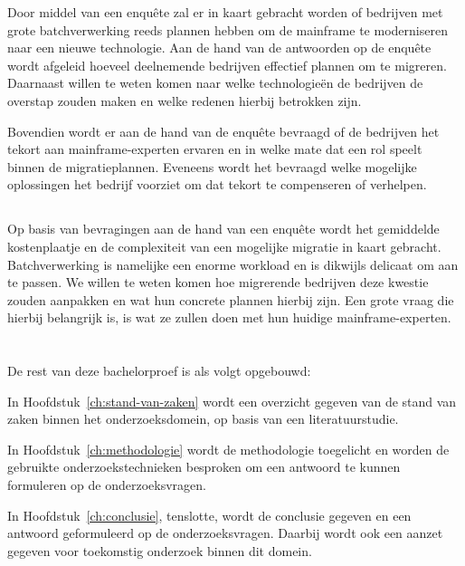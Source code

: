 Door middel van een enquête zal er in kaart gebracht worden of bedrijven met grote batchverwerking reeds plannen hebben om de mainframe te moderniseren naar een nieuwe technologie. Aan de hand van de antwoorden op de enquête wordt afgeleid hoeveel deelnemende bedrijven effectief plannen om te migreren. Daarnaast willen te weten komen naar welke technologieën de bedrijven de overstap zouden maken en welke redenen hierbij betrokken zijn. 

Bovendien wordt er aan de hand van de enquête bevraagd of de bedrijven het tekort aan mainframe-experten ervaren en in welke mate dat een rol speelt binnen de migratieplannen. Eveneens wordt het bevraagd welke mogelijke oplossingen het bedrijf voorziet om dat tekort te compenseren of verhelpen. 

\subsection{}

Op basis van bevragingen aan de hand van een enquête wordt het gemiddelde kostenplaatje en de complexiteit van een mogelijke migratie in kaart gebracht. Batchverwerking is namelijke een enorme workload en is dikwijls delicaat om aan te passen. We willen te weten komen hoe migrerende bedrijven deze kwestie zouden aanpakken en wat hun concrete plannen hierbij zijn. Een grote vraag die hierbij belangrijk is, is wat ze zullen doen met hun huidige mainframe-experten. 

\section{}
\label{sec:opzet-bachelorproef}


De rest van deze bachelorproef is als volgt opgebouwd:

In Hoofdstuk~\ref{ch:stand-van-zaken} wordt een overzicht gegeven van de stand van zaken binnen het onderzoeksdomein, op basis van een literatuurstudie.

In Hoofdstuk~\ref{ch:methodologie} wordt de methodologie toegelicht en worden de gebruikte onderzoekstechnieken besproken om een antwoord te kunnen formuleren op de onderzoeksvragen.


In Hoofdstuk~\ref{ch:conclusie}, tenslotte, wordt de conclusie gegeven en een antwoord geformuleerd op de onderzoeksvragen. Daarbij wordt ook een aanzet gegeven voor toekomstig onderzoek binnen dit domein.